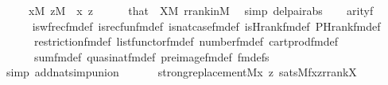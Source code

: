 \begin{isabellebody}
\ \ \ \ \ {\isachardoublequoteopen}x{\isasymin}M{\isachardoublequoteclose}\ {\isachardoublequoteopen}z{\isasymin}M{\isachardoublequoteclose}\ \ x\ z\isanewline
\ \ \ \ \isamarkupfalse%
\ that\ {}\ {\isacartoucheopen}X{\isasymin}M{\isacartoucheclose}\ rrank{\isacharunderscore}{\kern0pt}in{\isacharunderscore}{\kern0pt}M\ \isamarkupfalse%
\ {\isacharparenleft}{\kern0pt}simp\ del{\isacharcolon}{\kern0pt}pair{\isacharunderscore}{\kern0pt}abs{\isacharparenright}{\kern0pt}\isanewline
\ \ \isamarkupfalse%
\ {\isachardoublequoteopen}arity{\isacharparenleft}{\kern0pt}{\isacharquery}{\kern0pt}f{\isacharparenright}{\kern0pt}\ {\isacharequal}{\kern0pt}\ {}{\isachardoublequoteclose}\isanewline
\ \ \ \ \isamarkupfalse%
\ is{\isacharunderscore}{\kern0pt}wfrec{\isacharunderscore}{\kern0pt}fm{\isacharunderscore}{\kern0pt}def\ is{\isacharunderscore}{\kern0pt}recfun{\isacharunderscore}{\kern0pt}fm{\isacharunderscore}{\kern0pt}def\ is{\isacharunderscore}{\kern0pt}nat{\isacharunderscore}{\kern0pt}case{\isacharunderscore}{\kern0pt}fm{\isacharunderscore}{\kern0pt}def\ is{\isacharunderscore}{\kern0pt}Hrank{\isacharunderscore}{\kern0pt}fm{\isacharunderscore}{\kern0pt}def\ PHrank{\isacharunderscore}{\kern0pt}fm{\isacharunderscore}{\kern0pt}def\isanewline
\ \ \ \ \ \ restriction{\isacharunderscore}{\kern0pt}fm{\isacharunderscore}{\kern0pt}def\ list{\isacharunderscore}{\kern0pt}functor{\isacharunderscore}{\kern0pt}fm{\isacharunderscore}{\kern0pt}def\ number{}{\isacharunderscore}{\kern0pt}fm{\isacharunderscore}{\kern0pt}def\ cartprod{\isacharunderscore}{\kern0pt}fm{\isacharunderscore}{\kern0pt}def\isanewline
\ \ \ \ \ \ sum{\isacharunderscore}{\kern0pt}fm{\isacharunderscore}{\kern0pt}def\ quasinat{\isacharunderscore}{\kern0pt}fm{\isacharunderscore}{\kern0pt}def\ pre{\isacharunderscore}{\kern0pt}image{\isacharunderscore}{\kern0pt}fm{\isacharunderscore}{\kern0pt}def\ fm{\isacharunderscore}{\kern0pt}defs\isanewline
\ \ \ \ \isamarkupfalse%
\ {\isacharparenleft}{\kern0pt}simp\ add{\isacharcolon}{\kern0pt}nat{\isacharunderscore}{\kern0pt}simp{\isacharunderscore}{\kern0pt}union{\isacharparenright}{\kern0pt}\isanewline
\ \ \isamarkupfalse%
\isanewline
\ \ \isamarkupfalse%
\ {\isachardoublequoteopen}strong{\isacharunderscore}{\kern0pt}replacement{\isacharparenleft}{\kern0pt}{\isacharhash}{\kern0pt}{\isacharhash}{\kern0pt}M{\isacharcomma}{\kern0pt}{\isasymlambda}x\ z{\isachardot}{\kern0pt}\ sats{\isacharparenleft}{\kern0pt}M{\isacharcomma}{\kern0pt}{\isacharquery}{\kern0pt}f{\isacharcomma}{\kern0pt}{\isacharbrackleft}{\kern0pt}x{\isacharcomma}{\kern0pt}z{\isacharcomma}{\kern0pt}rrank{\isacharparenleft}{\kern0pt}X{\isacharparenright}{\kern0pt}{\isacharbrackright}{\kern0pt}{\isacharparenright}{\kern0pt}{\isacharparenright}{\kern0pt}{\isachardoublequoteclose}\isanewline

\end{isabellebody}
